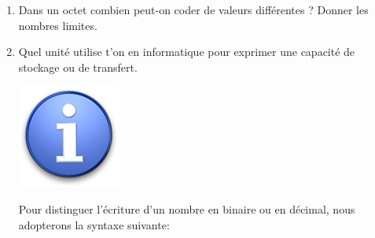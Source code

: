 \documentclass{article}
\begin{document}
\begin{enumerate}
\vspace{1em}
\begin{Form}
	\TextField[name=r7,width=\linewidth,height=2.5em,multiline=true]{}
\end{Form}
	\item Dans un octet combien peut-on coder de valeurs différentes ? Donner les nombres limites.\\
\vspace{1em}
\begin{Form}
	\TextField[name=r8,width=\linewidth,height=2.5em,multiline=true]{}
\end{Form}
	\item Quel unité utilise t'on en informatique pour exprimer une capacité de stockage ou de transfert.\\
\vspace{1em}
\begin{Form}
	\TextField[name=r9,width=\linewidth,height=2.5em,multiline=true]{}
\end{Form}
\begin{minipage}[b]{.08\linewidth}
	\includegraphics[width=\linewidth]{./figures/info.png}
	\vspace{1em}
\end{minipage}
\hfill
\begin{minipage}[b]{.85\linewidth}
Pour distinguer l'écriture d'un nombre en binaire ou en décimal, nous adopterons la syntaxe suivante:

\end{minipage}
\end{enumerate}
\end{document}
